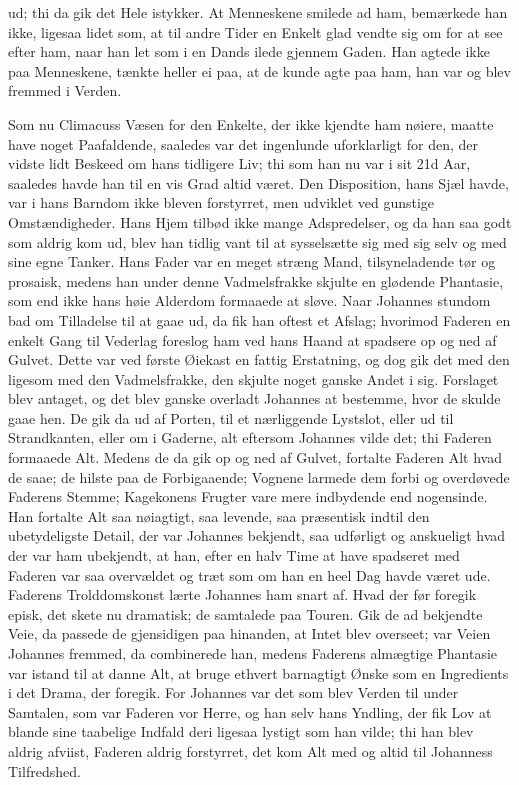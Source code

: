 \documentclass[12pt,a4paper]{article}
\begin{document}
ud; thi da gik det Hele istykker. At Menneskene smilede ad ham, bemærkede han ikke, ligesaa lidet som, at til andre Tider en Enkelt glad vendte sig om for at see efter ham, naar han let som i en Dands ilede gjennem Gaden. Han agtede ikke paa Menneskene, tænkte heller ei paa, at de kunde agte paa ham, han var og blev fremmed i Verden.

Som nu Climacuss Væsen for den Enkelte, der ikke kjendte ham nøiere, maatte have noget Paafaldende, saaledes var det ingenlunde uforklarligt for den, der vidste lidt Beskeed om hans tidligere Liv; thi som han nu var i sit 21d Aar, saaledes havde han til en vis Grad altid været. Den Disposition, hans Sjæl havde, var i hans Barndom ikke bleven forstyrret, men udviklet ved gunstige Omstændigheder. Hans Hjem tilbød ikke mange Adspredelser, og da han saa godt som aldrig kom ud, blev han tidlig vant til at sysselsætte sig med sig selv og med sine egne Tanker. Hans Fader var en meget stræng Mand, tilsyneladende tør og prosaisk, medens han under denne Vadmelsfrakke skjulte en glødende Phantasie, som end ikke hans høie Alderdom formaaede at sløve. Naar Johannes stundom bad om Tilladelse til at gaae ud, da fik han oftest et Afslag; hvorimod Faderen en enkelt Gang til Vederlag foreslog ham ved hans Haand at spadsere op og ned af Gulvet. Dette var ved første Øiekast en fattig Erstatning, og dog gik det med den ligesom med den Vadmelsfrakke, den skjulte noget ganske Andet i sig. Forslaget blev antaget, og det blev ganske overladt Johannes at bestemme, hvor de skulde gaae hen. De gik da ud af Porten, til et nærliggende Lystslot, eller ud til Strandkanten, eller om i Gaderne, alt eftersom Johannes vilde det; thi Faderen formaaede Alt. Medens de da gik op og ned af Gulvet, fortalte Faderen Alt hvad de saae; de hilste paa de Forbigaaende; Vognene larmede dem forbi og overdøvede Faderens Stemme; Kagekonens Frugter vare mere indbydende end nogensinde. Han fortalte Alt saa nøiagtigt, saa levende, saa præsentisk indtil den ubetydeligste Detail, der var Johannes bekjendt, saa udførligt og anskueligt hvad der var ham ubekjendt, at han, efter en halv Time at have spadseret med Faderen var saa overvældet og træt som om han en heel Dag havde været ude. Faderens Trolddomskonst lærte Johannes ham snart af. Hvad der før foregik episk, det skete nu dramatisk; de samtalede paa Touren. Gik de ad bekjendte Veie, da passede de gjensidigen paa hinanden, at Intet blev overseet; var Veien Johannes fremmed, da combinerede han, medens Faderens almægtige Phantasie var istand til at danne Alt, at bruge ethvert barnagtigt Ønske som en Ingredients i det Drama, der foregik. For Johannes var det som blev Verden til under Samtalen, som var Faderen vor Herre, og han selv hans Yndling, der fik Lov at blande sine taabelige Indfald deri ligesaa lystigt som han vilde; thi han blev aldrig afviist, Faderen aldrig forstyrret, det kom Alt med og altid til Johanness Tilfredshed.
\end{document}
